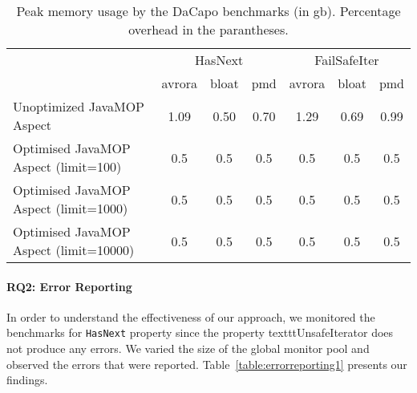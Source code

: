 \begin{table*}[!ht]
\centering
\begin{tabular}{|p{4cm}|c|c|c|c|c|c|}
\hline
  \multirow{2}{*}{}                                 & 
\multicolumn{3}{c|}{HasNext}           & \multicolumn{3}{c|}{FailSafeIter}       
      \\ \cline{2-7}                                              
                    & avrora           & bloat         & pmd      & avrora       
    & bloat         & pmd \\ \hline
Unoptimized JavaMOP Aspect     & 1.09 & 0.50 & 0.70  & 1.29 & 0.69 & 0.99 \\ 
\hline
Optimised JavaMOP Aspect (limit=100)   & 0.5  & 0.5  & 0.5   & 0.5  & 0.5  & 0.5 
  \\ \hline
Optimised JavaMOP Aspect (limit=1000)   & 0.5  & 0.5  & 0.5   & 0.5  & 0.5  & 
0.5   \\ \hline
Optimised JavaMOP Aspect (limit=10000)   & 0.5  & 0.5  & 0.5   & 0.5  & 0.5  & 
0.5   \\ \hline

\end{tabular}
\caption{Peak memory usage by the DaCapo benchmarks (in gb). Percentage overhead 
in the parantheses.}
\end{table*}
\label{table:memoryusage}


\paragraph{RQ2: Error Reporting}

In order to understand the effectiveness of our approach, we monitored the 
benchmarks for \texttt{HasNext} property since the property 
texttt{UnsafeIterator} does not produce
any errors. We varied the size of the global monitor pool and observed the 
errors that were reported. Table~\ref{table:errorreporting1} presents our 
findings.



